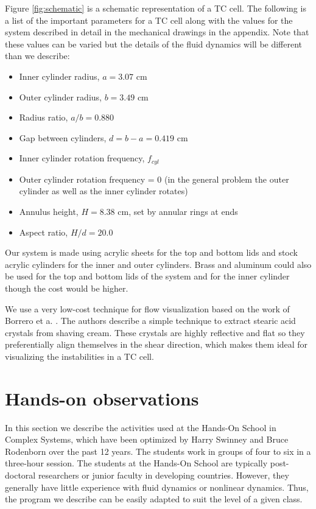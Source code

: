 \documentclass[%
 amsmath,amssymb,
 aps,
floatfix,
aps,prd,longbibliography,
notitlepage
]{revtex4-1}
\begin{document}
Figure \ref{fig:schematic} is a schematic representation of a TC cell. The following is a list of the important parameters for a TC cell along with the values for the system described in detail in the mechanical drawings in the appendix. Note that these values can be varied but the details of the fluid dynamics will be different than we describe:
\begin{itemize}
\item Inner cylinder radius, $a = 3.07$ cm
\item Outer cylinder radius, $b = 3.49$ cm
\item Radius ratio, $a/b = 0.880 $
\item Gap between cylinders, $d = b-a = 0.419$ cm
\item Inner cylinder rotation frequency, $f_{cyl}$
\item Outer cylinder rotation frequency = 0  (in the general problem the outer cylinder as well as the inner cylinder rotates)
\item Annulus height, $H= 8.38$ cm, set by annular rings at ends
\item Aspect ratio, $H/d = 20.0$

\end{itemize}
Our system is made using acrylic sheets for the top and bottom lids and stock acrylic cylinders for the inner and outer cylinders. Brass and aluminum could also be used for the top and bottom lids of the system and for the inner cylinder though the cost would be higher.

We use a very low-cost technique for flow visualization based on the work of Borrero et a. \cite{borrero_2018}. The authors describe a simple technique to extract stearic acid crystals from shaving cream. These crystals are highly reflective and flat so they preferentially align themselves in the shear direction, which makes them ideal for visualizing the instabilities in a TC cell.

\section{Hands-on observations}
In this section we describe the activities used at the Hands-On School in Complex Systems, which have been optimized by Harry Swinney and Bruce Rodenborn over the past 12 years. The students work in groups of four to six in a three-hour session. The students at the Hands-On School are typically post-doctoral researchers or junior faculty in developing countries. However, they generally have little experience with fluid dynamics or nonlinear dynamics. Thus, the program we describe can be easily adapted to suit the level of a given class.
\end{document}
